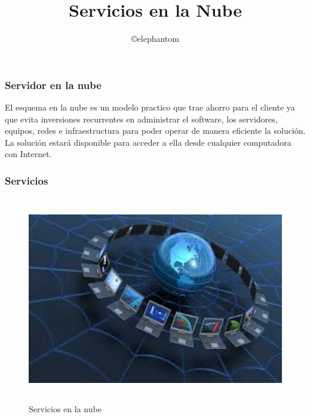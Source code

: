 \documentclass[12pt,letterpaper]{article}
\begin{document}
  {
	\sffamily %
	\title{Servicios en la Nube}
	\author{\copyright elephantom}
	\maketitle
	\tableofcontents
	\newpage
  }

  \begin{section}{\color{kblue}}
  	\begin{subsection}{\color{blackgreen}}
  	\sffamily
  	{

    \subsubsection{Servidor en la nube}
    El esquema en la nube es un modelo practico que trae ahorro para el cliente ya que evita inversiones recurrentes en administrar el software, los servidores, equipos, redes e infraestructura para poder operar de manera eficiente la solución.
    La solución estará disponible para acceder a ella desde cualquier computadora con Internet.

    \subsubsection{Servicios}
      \begin{figure}[htb]
        \centering
        \includegraphics[angle=0,width=140mm,height=90mm]{img/images_net.jpeg}
        \caption{Servicios en la nube}
        \label{sel064}
      \end{figure}


}
\end{subsection}
\end{section}
\end{document}
